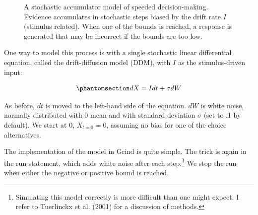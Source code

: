 \documentclass[
  a4paper,
  DIV=11,
  numbers=noendperiod,
  oneside]{scrreprt}
\begin{document}
\begin{figure}


\caption{\label{fig-ch4n-img7-old-55}A stochastic accumulator model of
speeded decision-making. Evidence accumulates in stochastic steps biased
by the drift rate \(I\) (stimulus related). When one of the bounds is
reached, a response is generated that may be incorrect if the bounds are
too low.}

\end{figure}%

One way to model this process is with a single stochastic linear
differential equation, called the drift-diffusion model (DDM), with
\(I\) as the stimulus-driven input:

\begin{equation}\phantomsection\label{eq-ch4n-6-old-26}{
dX = Idt + \sigma dW
}\end{equation}

As before, \(dt\) is moved to the left-hand side of the equation. \(dW\)
is white noise, normally distributed with 0 mean and with standard
deviation \(\sigma\) (set to .1 by default). We start at 0,
\(X_{t = 0} = 0\), assuming no bias for one of the choice alternatives.

The implementation of the model in Grind is quite simple. The trick is
again in the run statement, which adds white noise after each
step.\footnote{Simulating this model correctly is more difficult than
  one might expect. I refer to Tuerlinckx et al. (2001) for a discussion
  of methods.} We stop the run when either the negative or positive
bound is reached.
\end{document}
